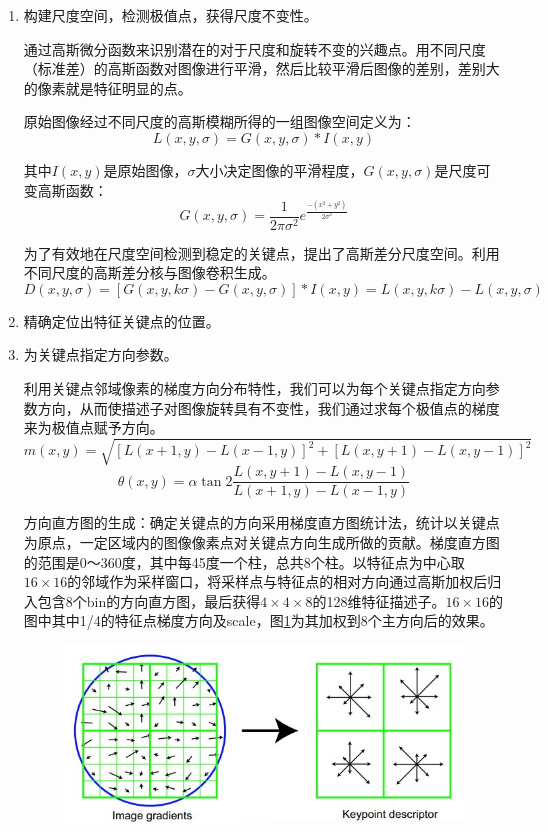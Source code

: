 \documentclass[12pt]{article}
\begin{document}
\begin{enumerate}
\item 构建尺度空间，检测极值点，获得尺度不变性。
    
    通过高斯微分函数来识别潜在的对于尺度和旋转不变的兴趣点。用不同尺度（标准差）的高斯函数对图像进行平滑，然后比较平滑后图像的差别，差别大的像素就是特征明显的点。
    
    原始图像经过不同尺度的高斯模糊所得的一组图像空间定义为：
    \begin{displaymath}
        L(x,y,\sigma)=G(x,y,\sigma)*I(x,y)
    \end{displaymath}
    
    其中$I(x,y)$是原始图像，$\sigma$大小决定图像的平滑程度，$G(x,y,\sigma)$是尺度可变高斯函数：
    \begin{displaymath}
        G(x,y,\sigma)=\frac{1}{2\pi \sigma^{2}}e^{\frac{-(x^{2}+y^{2})}{2\sigma^{2}}}
    \end{displaymath}
    
    为了有效地在尺度空间检测到稳定的关键点，提出了高斯差分尺度空间。利用 不同尺度的高斯差分核与图像卷积生成。
    \begin{displaymath}
        D(x,y,\sigma)=[G(x,y,k\sigma)-G(x,y,\sigma)]*I(x,y)=L(x,y,k\sigma)-L(x,y,\sigma)
    \end{displaymath}
    
\item 精确定位出特征关键点的位置。

\item 为关键点指定方向参数。

利用关键点邻域像素的梯度方向分布特性，我们可以为每个关键点指定方向参数方向，从而使描述子对图像旋转具有不变性，我们通过求每个极值点的梯度来为极值点赋予方向。
\begin{displaymath}
    m(x,y)=\sqrt{[L(x+1,y)-L(x-1,y)]^{2}+[L(x,y+1)-L(x,y-1)]^{2}}
\end{displaymath}
\begin{displaymath}
    \theta(x,y)=\alpha\tan2\frac{L(x,y+1)-L(x,y-1)}{L(x+1,y)-L(x-1,y)}
\end{displaymath}

方向直方图的生成：确定关键点的方向采用梯度直方图统计法，统计以关键点为原点，一定区域内的图像像素点对关键点方向生成所做的贡献。梯度直方图的范围是0～360度，其中每45度一个柱，总共8个柱。以特征点为中心取$16\times16$的邻域作为采样窗口，将采样点与特征点的相对方向通过高斯加权后归入包含8个bin的方向直方图，最后获得$4\times4\times8$的128维特征描述子。$16\times16$的图中其中1/4的特征点梯度方向及scale，图\ref{fig:eight}为其加权到8个主方向后的效果。
        \begin{figure}
            \centering
            \includegraphics[width=0.5\linewidth]{sift1}
            \caption{}
            \label{fig:eight}
        \end{figure}
        

\end{enumerate}
\end{document}
